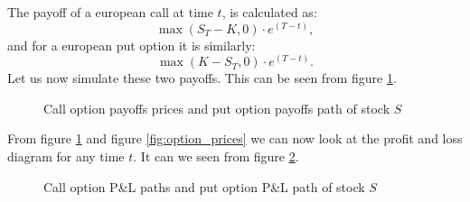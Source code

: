 \documentclass[a4paper, 12pt]{article}
\theoremstyle{definition}
\theoremstyle{plain}
\theoremstyle{definition}
\begin{document}
The payoff of a european call at time $t$, is 
calculated as: 
$$ 
\max (S_T - K, 0) \cdot e^{(T-t)}, 
$$
and for a european put option it is similarly:
$$ 
\max (K - S_T, 0) \cdot e^{(T-t)}. 
$$
Let us now simulate these two payoffs.
This can be seen from figure \ref{fig:option_payoff}.

\begin{figure}[ht!]
    \centering

    \caption{Call option payoffs prices 
            and put option payoffs path of stock $S$}
 \label{fig:option_payoff}
 \end{figure}

From figure \ref{fig:option_payoff}
and figure \ref{fig:option_prices}
we can now look at the profit and loss diagram for 
any time $t$.
It can we seen from figure \ref{fig:optionpl}.

\begin{figure}[ht!]
    \centering

    \caption{Call option P\&L paths 
            and put option P\&L path of stock $S$}
 \label{fig:optionpl}
 \end{figure}
\end{document}
